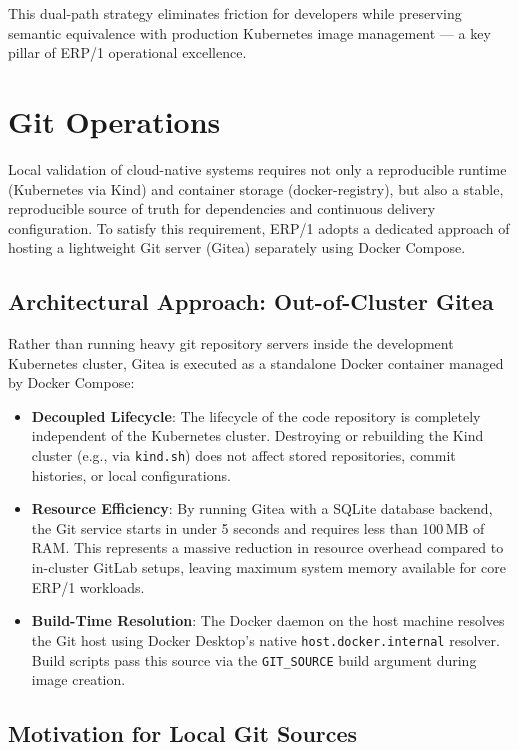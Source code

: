 \documentclass{article}
\begin{document}
This dual-path strategy eliminates friction for developers while preserving semantic
equivalence with production Kubernetes image management — a key pillar of ERP/1 operational excellence.

\newpage
\section{Git Operations}

Local validation of cloud-native systems requires not only a reproducible
runtime (Kubernetes via Kind) and container storage (docker-registry), but also a stable,
reproducible source of truth for dependencies and continuous delivery configuration.
To satisfy this requirement, ERP/1 adopts a dedicated approach of hosting a
lightweight Git server (Gitea) separately using Docker Compose.

\subsection{Architectural Approach: Out-of-Cluster Gitea}

Rather than running heavy git repository servers inside the development Kubernetes cluster,
Gitea is executed as a standalone Docker container managed by Docker Compose:
\begin{itemize}
    \item \textbf{Decoupled Lifecycle}: The lifecycle of the code repository is completely
          independent of the Kubernetes cluster. Destroying or rebuilding the Kind
          cluster (e.g., via \texttt{kind.sh}) does not affect stored repositories,
          commit histories, or local configurations.
    \item \textbf{Resource Efficiency}: By running Gitea with a SQLite database backend,
          the Git service starts in under 5 seconds and requires less than 100\,MB of RAM.
          This represents a massive reduction in resource overhead compared to in-cluster
          GitLab setups, leaving maximum system memory available for core ERP/1 workloads.
    \item \textbf{Build-Time Resolution}: The Docker daemon on the host machine resolves
          the Git host using Docker Desktop's native \texttt{host.docker.internal} resolver.
          Build scripts pass this source via the \texttt{GIT\_SOURCE} build argument
          during image creation.
\end{itemize}

\subsection{Motivation for Local Git Sources}
\end{document}

